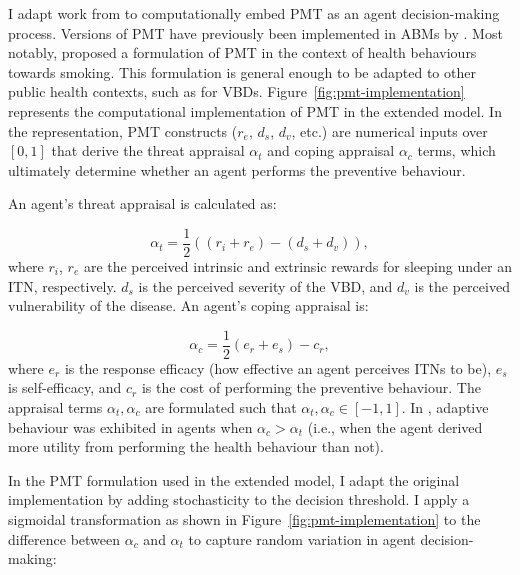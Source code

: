 I adapt work from \citet{kurchyna_seeing_2024} to computationally embed PMT as an agent decision-making process. Versions of PMT have previously been implemented in ABMs by \citet{tan_unveiling_2024,ghoreishi_unlocking_2024}. Most notably, \citet{kurchyna_seeing_2024} proposed a formulation of PMT in the context of health behaviours towards smoking. This formulation is general enough to be adapted to other public health contexts, such as for VBDs. Figure~\ref{fig:pmt-implementation} represents the computational implementation of PMT in the extended model. In the representation, PMT constructs ($r_e$, $d_s$, $d_v$, etc.) are numerical inputs over $[0,1]$ that derive the threat appraisal $\alpha_t$ and coping appraisal $\alpha_c$ terms, which ultimately determine whether an agent performs the preventive behaviour.

An agent's threat appraisal is calculated as:

\begin{equation}\label{eq:alpha-t}
    \alpha_t=\frac{1}{2}\left((r_i+r_e)-(d_s+d_v)\right),
\end{equation}
where $r_i$, $r_e$ are the perceived intrinsic and extrinsic rewards for sleeping under an ITN, respectively. $d_s$ is the perceived severity of the VBD, and $d_v$ is the perceived vulnerability of the disease. An agent's coping appraisal is:

\begin{equation}\label{eq:alpha-c}
    \alpha_c=\frac{1}{2}(e_r+e_s)-c_r,
\end{equation}
where $e_r$ is the response efficacy (how effective an agent perceives ITNs to be), $e_s$ is self-efficacy, and $c_r$ is the cost of performing the preventive behaviour. The appraisal terms $\alpha_t,\alpha_c$ are formulated such that $\alpha_t,\alpha_c\in[-1,1]$. In \citet{kurchyna_seeing_2024}, adaptive behaviour was exhibited in agents when $\alpha_c>\alpha_t$ (i.e., when the agent derived more utility from performing the health behaviour than not).

In the PMT formulation used in the extended model, I adapt the original implementation by adding stochasticity to the decision threshold. I apply a sigmoidal transformation as shown in Figure~\ref{fig:pmt-implementation} to the difference between $\alpha_c$ and $\alpha_t$ to capture random variation in agent decision-making:

